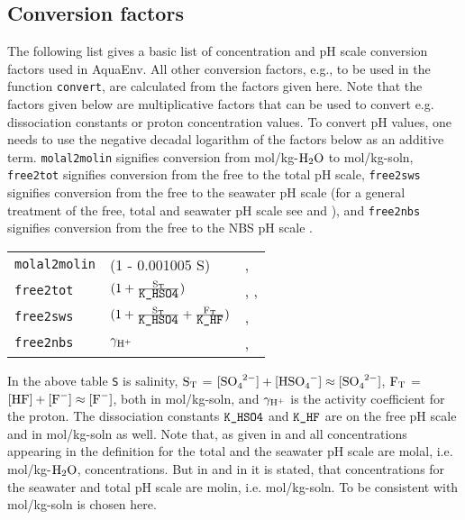 \documentclass[a4paper]{article}
\begin{document}
\subsection{Conversion factors}
The following list gives a basic list of concentration and pH scale conversion factors used in \textsf{AquaEnv}. All other conversion factors, e.g., to be used in the function \texttt{convert}, are calculated from the factors given here. Note that the factors given below are multiplicative factors that can be used to convert e.g. dissociation constants or proton concentration values. To convert pH values, one needs to use the negative decadal logarithm of the factors below as an additive term. \texttt{molal2molin} signifies conversion from mol/kg-$\rm H_2O$ to mol/kg-soln, \texttt{free2tot} signifies conversion from the free to the total pH scale, \texttt{free2sws}  signifies conversion from the free to the seawater pH scale (for a general treatment of the free, total and seawater pH scale see \citet{Dickson1984} and \citet{Zeebe2001}), and \texttt{free2nbs} signifies conversion from the free to the NBS pH scale \citep{Durst1975}.
\begin{center}
\begin{tabular}{|llp{}|} \hline
\texttt{molal2molin} & (1 - 0.001005 S) & \citet[p. 257]{Roy1993a}, \citet[chap. 5, p. 15]{DOE1994}\\
\texttt{free2tot} & $\rm (1 + \frac{S_T}{\mbox{\texttt{K\_HSO4}}})$ &\citet[p. 2302]{Dickson1984}, \citet[chap. 5, p. 16]{DOE1994}, \citet[p. 57, p. 261]{Zeebe2001}\\
\texttt{free2sws} &  $\rm (1 + \frac{S_T}{\mbox{\texttt{K\_HSO4}}} + \frac{F_T}{\mbox{\texttt{K\_HF}}})$ & \citet[p. 2303]{Dickson1984}, \citet{Zeebe2001}\\
\texttt{free2nbs} &  $\rm \gamma_{\rm H^+}$ & \citet{Dickson1984}, \citet{Zeebe2001}\\ \hline
\end{tabular}
\end{center}
In the above table \texttt{S} is salinity, $\rm S_T$ = $[\ce{SO_4^{2-}}] + [\ce{HSO_4^-}] \approx [\ce{SO_4^{2-}}]$, $\rm F_T$ = $\rm [\ce{HF}] + [\ce{F^-}] \approx [\ce{F^-}]$, both in mol/kg-soln, and $\rm \gamma_{\rm H^+}$ is the activity coefficient for the proton. The dissociation constants $\mbox{\texttt{K\_HSO4}}$ and $\mbox{\texttt{K\_HF}}$ are on the free pH scale and in mol/kg-soln as well. Note that, as given in \citet[p. 2303]{Dickson1984} and \citet[p. 91f]{Dickson1979} all concentrations appearing in the definition for the total and the seawater pH scale are molal, i.e.  mol/kg-$\rm H_2O$, concentrations. But in \citet[p. 257]{Roy1993a} and in \citet[chap.. 4, SOP 6, p. 1]{DOE1994} it is stated, that concentrations for the seawater and total pH scale are molin, i.e. mol/kg-soln. To be consistent with \citet{DOE1994} mol/kg-soln is chosen here.
\end{document}
